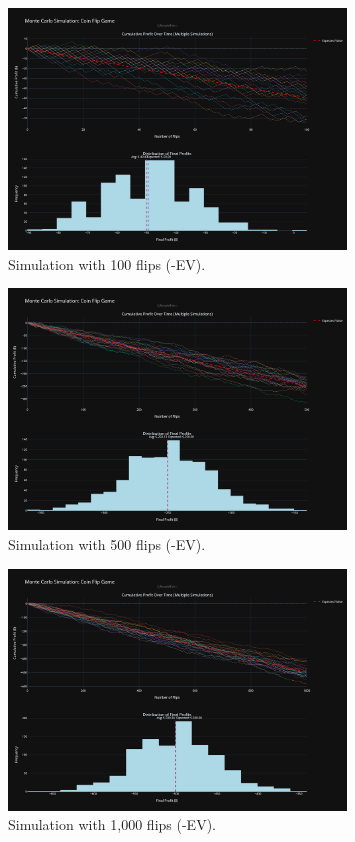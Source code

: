 \documentclass[12pt]{article}
\begin{document}
\begin{figure}[h!]
\centering
\includegraphics[width=0.8\textwidth]{-ev/100-ev.png}
\caption{Simulation with 100 flips (-EV).}
\end{figure}
\clearpage

\begin{figure}[h!]
\centering
\includegraphics[width=0.8\textwidth]{-ev/500-ev.png}
\caption{Simulation with 500 flips (-EV).}
\end{figure}

\begin{figure}[h!]
\centering
\includegraphics[width=0.8\textwidth]{-ev/1000-ev.png}
\caption{Simulation with 1,000 flips (-EV).}
\end{figure}
\clearpage
\end{document}
